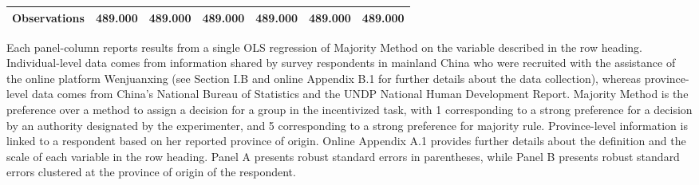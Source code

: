 \begin{table}
{\begin{tabular}{l*{6}{c}}
Observations    &  489.000&  489.000&  489.000&  489.000&  489.000&  489.000\\
        \hline\hline        \end{tabular}}            \begin{adjustwidth}{-1cm}{-1cm}             \begin{scriptsize}       Each panel-column reports results from a single OLS regression of Majority Method on the variable described in the row heading. Individual-level data comes from information shared by survey respondents in mainland China who were recruited with the assistance of the online platform Wenjuanxing (see Section I.B and online Appendix B.1 for further details about the data collection), whereas province-level data comes from China's National Bureau of Statistics and the UNDP National Human Development Report. Majority Method is the preference over a method to assign a decision for a group in the incentivized task, with 1 corresponding to a strong preference for a decision by an authority designated by the experimenter, and 5 corresponding to a strong preference for majority rule. Province-level information is linked to a respondent based on her reported province of origin. Online Appendix A.1 provides further details about the definition and the scale of each variable in the row heading. Panel A presents robust standard errors in parentheses, while Panel B presents robust standard errors clustered at the province of origin of the respondent.           \end{scriptsize} \end{adjustwidth} \end{table}
\documentclass[]{article}
\usepackage{amssymb}
\usepackage{adjustbox}
\usepackage{booktabs}
\usepackage{changepage}



